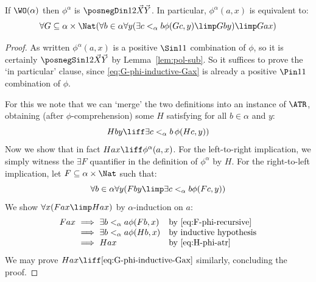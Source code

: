 \begin{proposition}
\label{prop:approx-is-posD12}
If $\WO(\alpha)$ then $\phi^\alpha$ is $\posnegDin 1 2 {\vec X}{\vec Y}$.
In particular, $\phi^\alpha(a,x)$ is equivalent to:
\begin{equation}
    \label{eq:G-phi-inductive-Gax}
\forall G \subseteq \alpha \times \Nat
(\forall b \in \alpha \forall y (\exists c <_\alpha b \phi (Gc,y) \limp Gby) \limp Gax )
\end{equation}
\end{proposition}
\begin{proof}
As written $\phi^\alpha (a,x)$ is a positive $\Sin 1 1 $ combination of $\phi$, so it is certainly $\posnegSin 1 2 {\vec X}{\vec Y}$ by Lemma~\ref{lem:pol-sub}.
So it suffices to prove the `in particular' clause,
since \eqref{eq:G-phi-inductive-Gax} is already a positive $\Pin 1 1 $ combination of $\phi$.%

For this we note that we can `merge' the two definitions into an instance of $\ATR$, obtaining (after $\phi$-comprehension) some $H$ satisfying for all $b\in \alpha $ and $y$:
\begin{equation}
    \label{eq:H-phi-atr}
    Hby \liff \exists c <_\alpha b\,  \phi(Hc,y))
\end{equation}
Now we show that in fact $Hax \liff \phi^\alpha(a,x) $. For the left-to-right implication, we simply witness the $\exists F$ quantifier in the definition of $\phi^\alpha$ by $H$.
For the right-to-left implication, let $F\subseteq \alpha \times \Nat$ such that:
\begin{equation}
    \label{eq:F-phi-recursive}
\forall b \in \alpha \forall y (Fby \limp \exists c <_\alpha b \phi (Fc,y))
\end{equation}
We show $\forall x(Fax \limp Hax)$ by $\alpha$-induction on $a$:
\[
\begin{array}{r@{\ \implies \ }ll}
     Fax & \exists b<_\alpha a \phi (Fb,x) & \text{by \eqref{eq:F-phi-recursive}} \\
        & \exists b<_{\alpha} a \phi (Hb,x) & \text{by inductive hypothesis} \\
        & Hax & \text{by \eqref{eq:H-phi-atr}}
\end{array}
\]
We may prove $Hax \liff \eqref{eq:G-phi-inductive-Gax} $ similarly, concluding the proof.
\end{proof}



